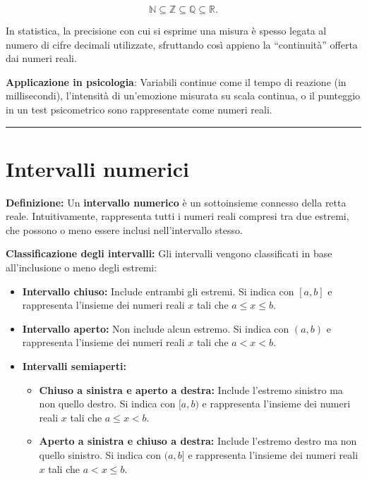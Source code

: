 \documentclass[
  italian,
  letterpaper,
  a4paper,
  11pt,
  open=any]{scrbook}
\providecommand{\tightlist}{%
  \setlength{\itemsep}{0pt}\setlength{\parskip}{0pt}}
\theoremstyle{plain}
\theoremstyle{definition}
\theoremstyle{definition}
\theoremstyle{remark}
\begin{document}
\[
\mathbb{N} \subseteq \mathbb{Z} \subseteq \mathbb{Q} \subseteq \mathbb{R}.
\]

In statistica, la precisione con cui si esprime una misura è spesso
legata al numero di cifre decimali utilizzate, sfruttando così appieno
la ``continuità'' offerta dai numeri reali.

\textbf{Applicazione in psicologia}: Variabili continue come il tempo di
reazione (in millisecondi), l'intensità di un'emozione misurata su scala
continua, o il punteggio in un test psicometrico sono rappresentate come
numeri reali.

\begin{center}\rule{0.5\linewidth}{0.5pt}\end{center}

\section{Intervalli numerici}\label{intervalli-numerici}

\textbf{Definizione:} Un \textbf{intervallo numerico} è un sottoinsieme
connesso della retta reale. Intuitivamente, rappresenta tutti i numeri
reali compresi tra due estremi, che possono o meno essere inclusi
nell'intervallo stesso.

\textbf{Classificazione degli intervalli:} Gli intervalli vengono
classificati in base all'inclusione o meno degli estremi:

\begin{itemize}
\tightlist
\item
  \textbf{Intervallo chiuso:} Include entrambi gli estremi. Si indica
  con \([a, b]\) e rappresenta l'insieme dei numeri reali \(x\) tali che
  \(a \leq x \leq b\).
\item
  \textbf{Intervallo aperto:} Non include alcun estremo. Si indica con
  \((a, b)\) e rappresenta l'insieme dei numeri reali \(x\) tali che
  \(a < x < b\).
\item
  \textbf{Intervalli semiaperti:}

  \begin{itemize}
  \tightlist
  \item
    \textbf{Chiuso a sinistra e aperto a destra:} Include l'estremo
    sinistro ma non quello destro. Si indica con \([a, b)\) e
    rappresenta l'insieme dei numeri reali \(x\) tali che
    \(a \leq x < b\).
  \item
    \textbf{Aperto a sinistra e chiuso a destra:} Include l'estremo
    destro ma non quello sinistro. Si indica con \((a, b]\) e
    rappresenta l'insieme dei numeri reali \(x\) tali che
    \(a < x \leq b\).
  \end{itemize}
\end{itemize}
\end{document}
